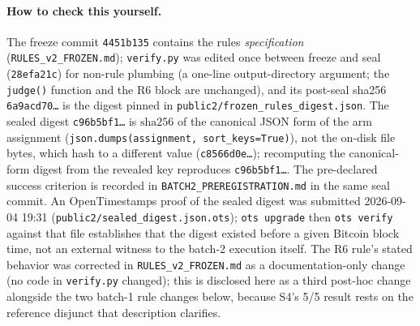\documentclass[11pt]{article}
\begin{document}
\paragraph{How to check this yourself.} The freeze commit \texttt{4451b135}
contains the rules \emph{specification}
(\nolinkurl{RULES_v2_FROZEN.md});
\nolinkurl{verify.py} was edited once between freeze and seal
(\texttt{28efa21c}) for non-rule plumbing (a one-line output-directory
argument; the \texttt{judge()} function and the R6 block are unchanged), and
its post-seal sha256 \texttt{6a9acd70\ldots} is the digest pinned in
\nolinkurl{public2/frozen_rules_digest.json}. The sealed digest
\texttt{c96b5bf1\ldots} is \(\mathrm{sha256}\) of the canonical JSON form of
the arm assignment (\nolinkurl{json.dumps(assignment, sort_keys=True)}), not
the on-disk file bytes, which hash to a different value
(\texttt{c8566d0e\ldots}); recomputing the canonical-form digest from the
revealed key reproduces \texttt{c96b5bf1\ldots}. The pre-declared success
criterion is recorded in \nolinkurl{BATCH2_PREREGISTRATION.md} in the same
seal commit. An OpenTimestamps proof of the sealed digest was submitted
2026-09-04 19:31 (\nolinkurl{public2/sealed_digest.json.ots});
\texttt{ots upgrade} then \texttt{ots verify} against that file establishes
that the digest existed before a given Bitcoin block time, not an external
witness to the batch-2 execution itself. The R6 rule's stated behavior was
corrected in \nolinkurl{RULES_v2_FROZEN.md} as a documentation-only change
(no code in \nolinkurl{verify.py} changed); this is disclosed here as a
third post-hoc change alongside the two batch-1 rule changes below, because
S4's 5/5 result rests on the reference disjunct that description
clarifies.
\end{document}
